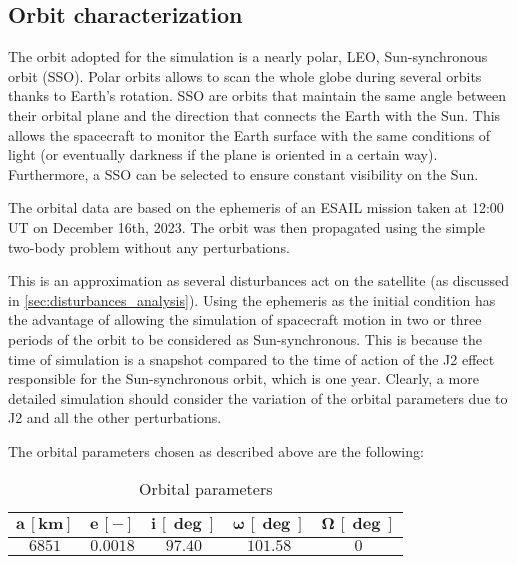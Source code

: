 \subsection{Orbit characterization}
\label{subsec:orbit_characterization}

The orbit adopted for the simulation is a nearly polar, LEO, Sun-synchronous orbit (SSO). Polar orbits allows to scan the whole globe during several orbits thanks to Earth's rotation. SSO are orbits that maintain the same angle between their orbital plane and the direction that connects the Earth with the Sun.\cite{curtis_book} This allows the spacecraft to monitor the Earth surface with the same conditions of light (or eventually darkness if the plane is oriented in a certain way). Furthermore, a SSO can be selected to ensure constant visibility on the Sun.\cite{esa_sso_site}

The orbital data are based on the ephemeris of an ESAIL mission taken at 12:00 UT on December 16th, 2023. The orbit was then propagated using the simple two-body problem without any perturbations.

This is an approximation as several disturbances act on the satellite (as discussed in \autoref{sec:disturbances_analysis}). Using the ephemeris as the initial condition has the advantage of allowing the simulation of spacecraft motion in two or three periods of the orbit to be considered as Sun-synchronous. This is because the time of simulation is a snapshot compared to the time of action of the J2 effect responsible for the Sun-synchronous orbit, which is one year. Clearly, a more detailed simulation should consider the variation of the orbital parameters due to J2 and all the other perturbations.

The orbital parameters chosen as described above are the following:

\begin{table}[H]

    \centering
    \begin{tabular}{|c|c|c|c|c|}
    \hline
    $\bm{a \, [km]}$ & $\bm{e \, [-]}$ & $\bm{i \, [\deg]}$  & $\bm{\omega \, [\deg]}$   & $\bm{\Omega \, [\deg]}$ \\
    \hline
    $6851$ & $0.0018$ & $97.40$ & $101.58$ & $0$ \\
    \hline
    \end{tabular}
    
    \caption{Orbital parameters}
    \label{table:orb_table}
    
\end{table}

